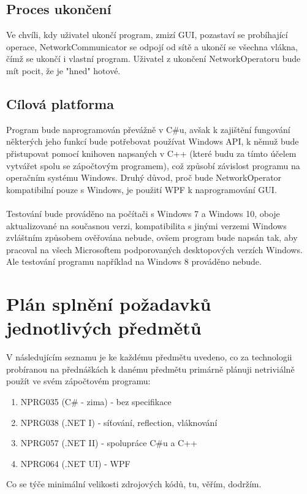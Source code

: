 \documentclass[12pt]{article}
\begin{document}
\subsection{Proces ukončení}
Ve chvíli, kdy uživatel ukončí program, zmizí GUI, pozastaví se probíhající operace, NetworkCommunicator se odpojí od sítě a ukončí se všechna vlákna, čímž se ukončí i vlastní program. Uživatel z ukončení NetworkOperatoru bude mít pocit, že je "hned" hotové.

\subsection{Cílová platforma}
Program bude naprogramován převážně v C\#u, avšak k zajištění fungování některých jeho funkcí bude potřebovat používat Windows API, k němuž bude přistupovat pomocí knihoven napsaných v C++ (které budu za tímto účelem vytvářet spolu se zápočtovým programem), což způsobí závislost programu na operačním systému Windows. Druhý důvod, proč bude NetworkOperator kompatibilní pouze s Windows, je použití WPF k naprogramování GUI.\\\\
Testování bude prováděno na počítači s Windows 7 a Windows 10, oboje aktualizované na současnou verzi, kompatibilita s jinými verzemi Windows zvláštním způsobem ověřována nebude, ovšem program bude napsán tak, aby pracoval na všech Microsoftem podporovaných desktopových verzích Windows. Ale testování programu například na Windows 8 prováděno nebude.

\newpage
\section{Plán splnění požadavků jednotlivých předmětů}
V následujícím seznamu je ke každému předmětu uvedeno, co za technologii probíranou na přednáškách k danému předmětu primárně plánuji netriviálně použít ve svém zápočtovém programu:
\begin{enumerate}[leftmargin=5mm]
\item NPRG035 (C\# - zima) - bez specifikace
\item NPRG038 (.NET I) - síťování, reflection, vláknování
\item NPRG057 (.NET II) - spolupráce C\#u a C++
\item NPRG064 (.NET UI) - WPF
\end{enumerate}
Co se týče minimální velikosti zdrojových kódů, tu, věřím, dodržím.
\end{document}

